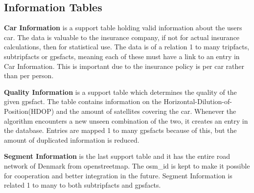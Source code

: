 \subsection{Information Tables}

\textbf{Car Information} is a support table holding valid information about the users car. The data is valuable to the insurance company, if not for actual insurance calculations, then for statistical use. The data is of a relation 1 to many tripfacts, subtripfacts or gpsfacts, meaning each of these must have a link to an entry in Car Information. This is important due to the insurance policy is per car rather than per person.

\textbf{Quality Information} is a support table which determines the quality of the given gpsfact. The table contains information on the Horizontal-Dilution-of-Position(HDOP) and the amount of satellites covering the car. Whenever the algorithm encounters a new unseen combination of the two, it creates an entry in the database. Entries are mapped 1 to many gpsfacts because of this, but  the amount of duplicated information is reduced.

\textbf{Segment Information} is the last support table and it has the entire road network of Denmark from openstreetmap. The osm\_id is kept to make it possible for cooperation and better integration in the future. Segment Information is related 1 to many to both subtripfacts and gpsfacts.